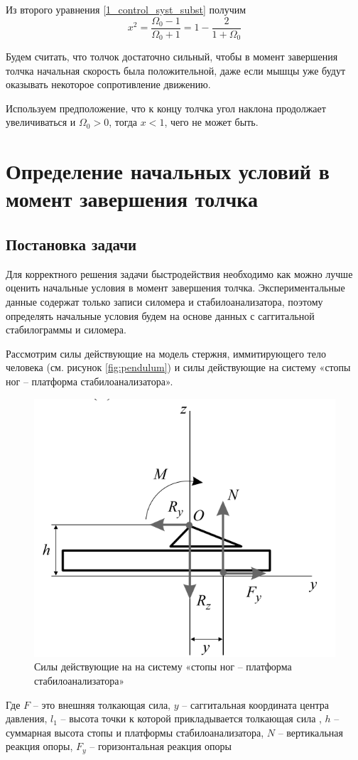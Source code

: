 \documentclass[a4paper,12pt, openany]{book}
\theoremstyle{plain} %
\theoremstyle{definition} %
\theoremstyle{remark} %
\numberwithin{equation}{chapter}
\begin{document}
{Из второго уравнения \eqref{1_control_syst_subst} получим
$$x^2=\dfrac{\Omega_0-1}{\Omega_0+1}=1-\dfrac{2}{1+\Omega_0}$$

Будем считать, что толчок достаточно сильный, чтобы в момент завершения
 толчка начальная скорость была положительной, даже если мышцы уже
  будут оказывать некоторое сопротивление движению.

Используем предположение, что к концу толчка угол наклона продолжает увеличиваться и $\Omega_0>0$,
тогда $x<1$, чего не может быть.

\chapter{Определение начальных условий в момент завершения толчка}
\section{Постановка задачи}
Для корректного решения задачи быстродействия необходимо как можно лучше оценить
начальные условия в момент завершения толчка. Экспериментальные данные содержат только записи силомера
и стабилоанализатора, поэтому определять начальные условия будем на основе данных с саггитальной стабилограммы и силомера.

Рассмотрим силы действующие на модель стержня, иммитирующего тело человека (см. рисунок \ref{fig:pendulum})
и силы действующие на систему «стопы ног – платформа стабилоанализатора».
\begin{figure}[h!]
    \centering
    \includegraphics[width=0.5\linewidth]{foot.png}
    \caption{Силы действующие на на систему «стопы ног – платформа стабилоанализатора» }
    \label{fig:foot-platform}
\end{figure}

Где $F$ – это внешняя толкающая сила, $y$ – саггитальная координата центра давления, $l_1$ – высота точки к которой прикладывается толкающая сила
, $h$ – суммарная высота стопы и платформы стабилоанализатора, $N$ – вертикальная реакция опоры, $F_y$ – горизонтальная реакция опоры

}
\end{document}
